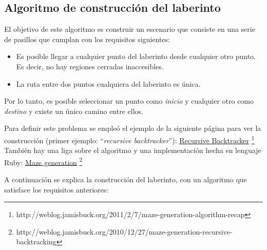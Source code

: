 \subsection{Algoritmo de construcci\'on del laberinto}

El objetivo de este algoritmo es construir un escenario que consiste en una serie de pasillos que cumplan con los requisitos siguientes:
\begin{itemize}
 \item Es posible llegar a cualquier punto del laberinto desde cualquier otro punto.  Es decir, no hay regiones cerradas inaccesibles.
 \item La ruta entre dos puntos cualquiera del laberinto es única.
\end{itemize}
Por lo tanto, es posible seleccionar un punto como \textit{inicio} y cualquier otro como \textit{destino} y existe un único camino entre ellos.

Para definir este problema se empleó el ejemplo de la siguiente página para ver la construcción (primer ejemplo: ``\textit{recursive backtracker}''):
\href{http://weblog.jamisbuck.org/2011/2/7/maze-generation-algorithm-recap}{Recursive Backtracker}
\footnote{http://weblog.jamisbuck.org/2011/2/7/maze-generation-algorithm-recap}
También hay una liga sobre el algoritmo y una implementación hecha en lenguaje Ruby:
\href{http://weblog.jamisbuck.org/2010/12/27/maze-generation-recursive-backtracking}{Maze generation}
\footnote{http://weblog.jamisbuck.org/2010/12/27/maze-generation-recursive-backtracking}

\noindent A continuación se explica la construcción del laberinto, con un algoritmo que satisface los requisitos anteriores:

